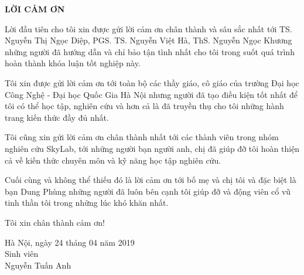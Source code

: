 \documentclass[12pt]{report}
\begin{document}
		\newpage
		\begin{center}
			\textbf{\large LỜI CẢM ƠN}
																																																																																																										 
																																																																																																									
		\end{center}
																																																																						
		Lời đầu tiên cho tôi xin được gửi lời cảm ơn chân thành và sâu sắc nhất tới TS. Nguyễn Thị Ngọc Diệp, PGS. TS. Nguyễn Việt Hà, ThS. Nguyễn Ngọc Khương những người đã hướng dẫn và chỉ bảo tận tình nhất cho tôi trong suốt quá trình hoàn thành khóa luận tốt nghiệp này.
																																																																						
		Tôi xin được gửi lời cảm ơn tới toàn bộ các thầy giáo, cô giáo của trường Đại học Công Nghệ - Đại học Quốc Gia Hà Nội nhưng người đã tạo điều kiện tốt nhất để tôi có thể học tập, nghiên cứu và hơn cả là đã truyền thụ cho tôi những hành trang kiến thức đầy đủ nhất.
																																																																						
		Tôi cũng xin gửi lời cảm ơn chân thành nhất tới các thành viên trong nhóm nghiên cứu SkyLab, tới những người bạn người anh, chị đã giúp đỡ tôi hoàn thiện cả về kiến thức chuyên môn và kỹ năng học tập nghiên cứu.
																																																																						
		Cuối cùng và không thể thiếu đó là lời cảm ơn tới bố mẹ và chị tôi và đặc biệt là bạn Dung Phùng những người đã luôn bên cạnh tôi giúp đỡ và động viên cổ vũ tinh thần tôi trong những lúc khó khăn nhất.
																																																																						
		Tôi xin chân thành cảm ơn!
																																																																						
		\begin{flushright}
			\begin{varwidth}{\linewidth}\centering
				Hà Nội, ngày 24 tháng 04 năm 2019\\
				Sinh viên\\[2cm]
				Nguyễn Tuấn Anh
			\end{varwidth}
		\end{flushright}
																																																																							
\end{document}
